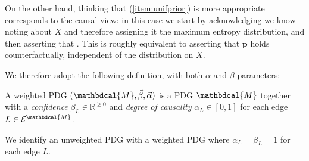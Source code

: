 \documentclass[letterpaper]{article} %
\theoremstyle{plain}
\theoremstyle{definition}
\theoremstyle{remark}
\newcommand\mat[1]{\mathbf{#1}}
\newcommand{\Ed}{\mathcal E}
\newcommand{\dg}[1]{\mathbdcal{#1}}
\begin{document}
{\begin{example}
		
		On the other hand, thinking that (\ref{item:unifprior}) is more appropriate corresponds to the causal view: in this case we start by acknowledging we know noting about $X$ and therefore assigning it the maximum entropy distribution, and then asserting that . This is roughly equivalent to asserting that $\mat p$ holds counterfactually, independent of the distribution on $X$. 
	\end{example}
	
	We therefore adopt the following definition, with both $\alpha$ and $\beta$ parameters:

	\begin{defn}
		A weighted PDG $(\dg M, \vec \beta, \vec \alpha)$ is a PDG
	        $\dg M$ together with a \emph{confidence} $\beta_L \in \mathbb
	        R^{\geq 0}$ and \emph{degree of causality} $\alpha_L \in
	        [0,1]$ for each edge $L \in \Ed^\dg M$. 
	\end{defn}

	We identify an unweighted PDG with a weighted PDG where $\alpha_L
	= \beta_L = 1$ for each edge $L$.
}
\end{document}
